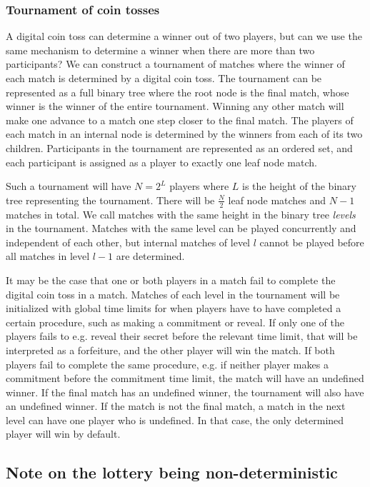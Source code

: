 \subsubsection{Tournament of coin tosses}
A digital coin toss can determine a winner out of two players, but can we use the same mechanism to determine a winner when there are more than two participants? We can construct a tournament of matches where the winner of each match is determined by a digital coin toss. The tournament can be represented as a full binary tree where the root node is the final match, whose winner is the winner of the entire tournament. Winning any other match will make one advance to a match one step closer to the final match. The players of each match in an internal node is determined by the winners from each of its two children. Participants in the tournament are represented as an ordered set, and each participant is assigned as a player to exactly one leaf node match. 

Such a tournament will have $N=2^L$ players where $L$ is the height of the binary tree representing the tournament. There will be $\frac{N}{2}$ leaf node matches and $N-1$ matches in total. We call matches with the same height in the binary tree \emph{levels} in the tournament. Matches with the same level can be played concurrently and independent of each other, but internal matches of level $l$ cannot be played before all matches in level $l-1$ are determined.

It may be the case that one or both players in a match fail to complete the digital coin toss in a match. Matches of each level in the tournament will be initialized with global time limits for when players have to have completed a certain procedure, such as making a commitment or reveal. If only one of the players fails to e.g. reveal their secret before the relevant time limit, that will be interpreted as a forfeiture, and the other player will win the match. If both players fail to complete the same procedure, e.g. if neither player makes a commitment before the commitment time limit, the match will have an undefined winner. If the final match has an undefined winner, the tournament will also have an undefined winner. If the match is not the final match, a match in the next level can have one player who is undefined. In that case, the only determined player will win by default.

\subsection{Note on the lottery being non-deterministic}

